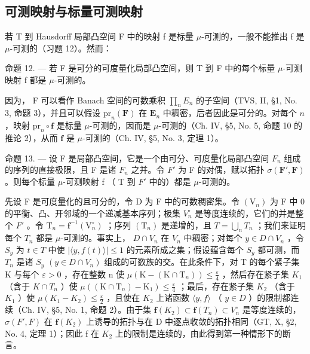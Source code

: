 \subsection{可测映射与标量可测映射}

若 T 到 Hausdorff 局部凸空间 F 中的映射 f 是标量 \(\mu\)-可测的，一般不能推出 f 是 \(\mu\)-可测的（习题 12）。然而：

命题 12. --- 若 F 是可分的可度量化局部凸空间，则 T 到 F 中的每个标量 \(\mu\)-可测映射 f 都是 \(\mu\)-可测的。

因为， F 可以看作 Banach 空间的可数乘积 \(\prod_{n}E_{n}\) 的子空间（TVS, II, §1, No. 3, 命题 3），并且可以假设 \(\mathrm{pr}_n(\mathbf{F})\) 在 \(\mathbf{E}_n\) 中稠密，后者因此是可分的。对每个 \(n\) ，映射 \(\mathrm{pr}_n \circ \mathbf{f}\) 是标量 \(\mu\)-可测的，因而是 \(\mu\)-可测的（Ch. IV, §5, No. 5, 命题 10 的推论 2），从而 \(\mathbf{f}\) 是 \(\mu\)-可测的（Ch. IV, §5, No. 3, 定理 1）。

命题 13. --- 设 F 是局部凸空间，它是一个由可分、可度量化局部凸空间 \(F_{n}\) 组成的序列的直接极限，且 F 是诸 \(F_{n}\) 之并。令 \(F'\) 为 F 的对偶，赋以拓扑 \(\sigma(\mathbf{F}',\mathbf{F})\) 。则每个标量 \(\mu\)-可测映射 f （ T 到 \(F'\) 中的）都是 \(\mu\)-可测的。

先设 F 是可度量化的且可分的，令 D 为 F 中的可数稠密集。令 \((\mathrm{V}_{n})\) 为 F 中 0 的平衡、凸、开邻域的一个递减基本序列；极集 \(V_{n}^{\circ}\) 是等度连续的，它们的并是整个 \(F'\) 。令 \(\mathrm{T}_{n} = \mathbf{f}^{-1}(\mathrm{V}_{n}^{\circ})\) ；序列 \((\mathrm{T}_{n})\) 是递增的，且 \(T = \bigcup_{n} T_{n}\) ；我们来证明每个 \(T_{n}\) 都是 \(\mu\)-可测的。事实上， \(D \cap V_{n}\) 在 \(V_{n}\) 中稠密；对每个 \(y \in D \cap V_{n}\) ，令 \(S_{y}\) 为 \(t \in T\) 中使 \(|\langle y, f(t) \rangle| \leqslant 1\) 的元素所成之集；假设蕴含每个 \(S_{y}\) 都可测，而 \(T_{n}\) 是诸 \(S_{y}\) \((y \in D \cap V_{n})\) 组成的可数族的交。在此条件下，对 T 的每个紧子集 K 与每个 \(\varepsilon > 0\) ，存在整数 n 使 \(\mu\left(\mathrm{K}-\left(\mathrm{K}\cap\mathrm{T}_{n}\right)\right)\leqslant\frac{\varepsilon}{4}\) ，然后存在紧子集 \(K_{1}\) （含于 \(K\cap T_{n}\) ）使 \(\mu\left(\left(\mathrm{K}\cap\mathrm{T}_{n}\right)-\mathrm{K}_{1}\right)\leqslant\frac{\varepsilon}{4}\) ；最后，存在紧子集 \(K_{2}\) （含于 \(K_{1}\) ）使 \(\mu(K_{1}-K_{2})\leqslant\frac{\varepsilon}{2}\) ，且使在 \(K_{2}\) 上诸函数 \(\langle y,f\rangle\) （ \(y\in D\) ）的限制都连续（Ch. IV, §5, No. 1, 命题 2）。由于集 \(\mathbf{f}(K_{2})\subset\mathbf{f}(T_{n})\subset V_{n}^{\circ}\) 是等度连续的， \(\sigma(F',F)\) 在 \(\mathbf{f}(K_{2})\) 上诱导的拓扑与在 D 中逐点收敛的拓扑相同（GT, X, §2, No. 4, 定理 1）；因此 f 在 \(K_{2}\) 上的限制是连续的，由此得到第一种情形下的断言。

